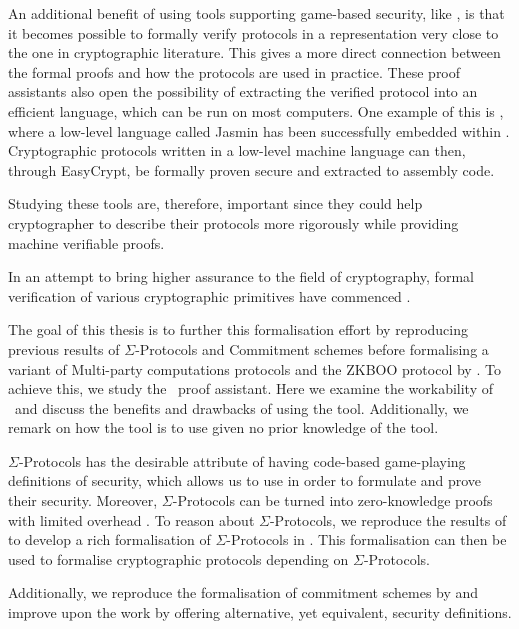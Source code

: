 An additional benefit of using tools supporting game-based security, like \easycrypt, is that
it becomes possible to formally verify protocols in a representation very close
to the one in cryptographic literature. This gives a more direct connection between
the formal proofs and how the protocols are used in practice.
These proof assistants also open the possibility of extracting the verified
protocol into an efficient language, which can be run on most computers.
One example of this is \easycrypt, where a low-level language called Jasmin has
been successfully embedded within \cite{easycrypt-jasmin}.
Cryptographic protocols written in a low-level machine language can
then, through EasyCrypt, be formally proven secure and extracted to assembly code.

Studying these tools are, therefore, important since they could help
cryptographer to describe their protocols more rigorously while providing
machine verifiable proofs.

In an attempt to bring higher assurance to the field of cryptography, formal
verification of various cryptographic primitives have commenced
\cite{SOK:CAC,ec_intro,cryptoeprint:2019:1185,certicrypt_sigma,DBLP:journals/corr/abs-1805-12482,DBLP:journals/corr/abs-1806-07197}.

The goal of this thesis is to further this formalisation effort by reproducing
previous results of $\Sigma$-Protocols and Commitment schemes before formalising
a variant of Multi-party computations protocols and the ZKBOO protocol by
\cite{zkboo}.
To achieve this, we study the \easycrypt\ proof assistant.
Here we examine the workability of \easycrypt\ and discuss
the benefits and drawbacks of using the tool. Additionally, we remark on how
the tool is to use given no prior knowledge of the tool.

$\Sigma$-Protocols has the desirable attribute of having code-based
game-playing definitions of security, which allows us to use \easycrypt in order to formulate
and prove their security. Moreover, $\Sigma$-Protocols can be turned into
zero-knowledge proofs with limited overhead \cite{zkboo}.
To reason about $\Sigma$-Protocols, we reproduce the results of \cite{cryptoeprint:2019:1185} to
develop a rich formalisation of $\Sigma$-Protocols in \easycrypt.
This formalisation can then be used to formalise cryptographic protocols
depending on $\Sigma$-Protocols.

Additionally, we reproduce the formalisation of commitment schemes by
\cite{DBLP:journals/corr/MetereD17} and improve upon the work by offering
alternative, yet equivalent, security definitions.

